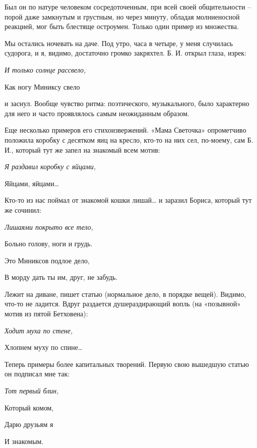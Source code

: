 	Был он по натуре человеком сосредоточенным, при всей своей общительности – порой даже замкнутым и грустным, но через минуту, обладая молниеносной реакцией, мог быть блестяще остроумен. Только один пример из множества.
	
	Мы остались ночевать на даче. Под утро, часа в четыре, у меня случилась судорога, и я, видимо, достаточно громко закряхтел. Б. И. открыл глаза, изрек:

\indent

{\itshape
		И только солнце рассвело,
		
		Как ногу Миниксу свело
}

\indent

и заснул. Вообще чувство ритма: поэтического, музыкального, было характерно для него и часто проявлялось самым неожиданным образом.

	Еще несколько примеров его стихоизвержений. «Мама Светочка» опрометчиво положила коробку с десятком яиц на кресло, кто-то на них сел, по-моему, сам Б. И., который тут же запел на знакомый всем мотив: 

\indent

{\itshape
		Я раздавил коробку с яйцами,
		
		Яйцами, яйцами…
}

\indent

Кто-то из нас поймал от знакомой кошки лишай… и заразил Бориса, который тут же сочинил:

\indent

{\itshape	
		Лишаями покрыто все тело,
		
		Больно голову, ноги и грудь.
		
		Это Миниксов подлое дело,
		
		В морду дать ты им, друг, не забудь.
}

\indent		

	Лежит на диване, пишет статью (нормальное дело, в порядке вещей). Видимо, что-то не ладится. Вдруг раздается душераздирающий вопль (на «позывной» мотив из пятой Бетховена):

\newpage

{\itshape
		Ходит муха по стене,
		
		Хлопнем муху по спине…
}		

\indent

Теперь примеры более капитальных творений. Первую свою вышедшую статью он подписал мне так:

\indent

{\itshape
		Тот первый блин,
		
        Который комом,
        
        Дарю друзьям я
        
        И знакомым.
}

